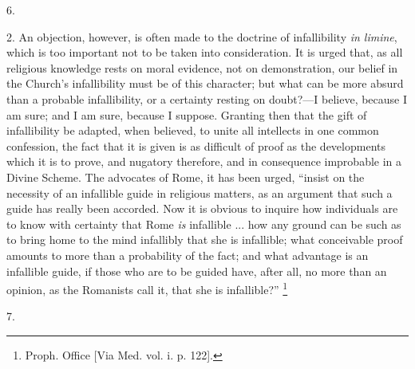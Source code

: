 6.

2. An objection, however, is often made to the
doctrine of infallibility \emph{in limine}, which is too
important not to be taken into consideration. It is urged
that, as all religious knowledge rests on moral evidence,
not on demonstration, our belief in the Church's
infallibility must be of this character; but what can be
more absurd than a probable infallibility, or a certainty
resting on doubt?—I believe, because I am sure; and
I am sure, because I suppose. Granting then that the gift
of infallibility be adapted, when believed, to unite all
intellects in one common confession, the fact that it is
given is as difficult of proof as the developments which
it is to prove, and nugatory therefore, and in
consequence improbable in a Divine Scheme. The advocates
of Rome, it has been urged, ``insist on the necessity
of an infallible guide in religious matters, as an
argument that such a guide has really been accorded. Now
it is obvious to inquire how individuals are to know with
certainty that Rome \emph{is} infallible ... how any
ground can be such as to bring home to the mind
infallibly that she is infallible; what conceivable proof
amounts to more than a probability of the fact; and what
advantage is an infallible guide, if those who are to be
guided have, after all, no more than an opinion, as the
Romanists call it, that she is infallible?'' \footnote{Proph. Office [Via Med. vol. i.
p. 122].}

7.

